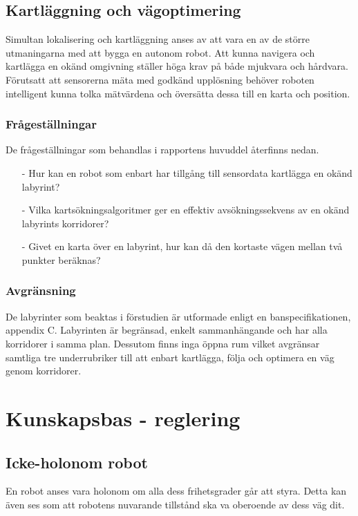 \documentclass[11pt]{article}
\begin{document}
\begin{flushleft}
\subsection{Kartläggning och vägoptimering}
Simultan lokalisering och kartläggning anses av \cite{grail} att vara en av de större utmaningarna med att bygga en autonom robot. Att kunna navigera och kartlägga en okänd omgivning ställer höga krav på både mjukvara och hårdvara. Förutsatt att sensorerna mäta med godkänd upplösning behöver roboten intelligent kunna tolka mätvärdena och översätta dessa till en karta och position. 

\subsubsection{Frågeställningar}
De frågeställningar som behandlas i rapportens huvuddel återfinns nedan.
\begin{itemize}
	\item [-] Hur kan en robot som enbart har tillgång till sensordata kartlägga en okänd labyrint?
	\item [-] Vilka kartsökningsalgoritmer ger en effektiv avsökningssekvens av en okänd labyrints korridorer?
	\item [-] Givet en karta över en labyrint, hur kan då den kortaste vägen mellan två punkter beräknas?
\end{itemize}
\subsubsection{Avgränsning}
De labyrinter som beaktas i förstudien är utformade enligt en banspecifikationen, appendix C. Labyrinten är begränsad, enkelt sammanhängande och har alla korridorer i samma plan. Dessutom finns inga öppna rum vilket avgränsar samtliga tre underrubriker till att enbart kartlägga, följa och optimera en väg genom korridorer. 


\pagebreak
\section{Kunskapsbas - reglering}

\subsection{Icke-holonom robot}
En robot anses vara holonom om alla dess frihetsgrader går att styra. Detta kan även ses som att robotens nuvarande tillstånd ska va oberoende av dess väg dit. 


\end{flushleft}
\end{document}
